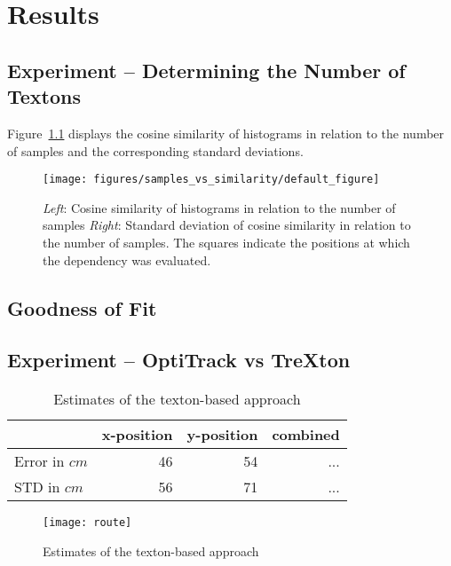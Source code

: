\chapter{Results}
\label{chap:results}

\section{Experiment -- Determining the Number of Textons}

Figure~\ref{fig:cosine} displays the cosine similarity of histograms
in relation to the number of samples and the corresponding standard
deviations.

\begin{figure}[h!]
\begin{center}
\texttt{[image: figures/samples\_vs\_similarity/default\_figure]}
\caption{{\label{fig:cosine} \emph{Left}:
    Cosine similarity of histograms in relation to the number of
    samples \emph{Right}: Standard deviation of cosine similarity in
    relation to the number of samples. The squares indicate the
    positions at which the dependency was evaluated.%
}}
\end{center}
\end{figure}

\section{Goodness of Fit}

\section{Experiment -- OptiTrack vs TreXton}
\label{sec:experiment-2}

\begin{table}[H]
  \centering
  \begin{tabular}{lrrr}
    \toprule
    & x-position & y-position & combined\\
    \midrule
    Error in $cm$ & 46 & 54 & ...\\
    STD in $cm$ & 56 & 71  & ...\\
    \bottomrule
  \end{tabular}
  \caption[Estimates of the texton-based approach]{Estimates of the texton-based approach}
  \label{tab:targetlanding}
\end{table}
\begin{figure}
\texttt{[image: route]}
  \caption[Estimates of the texton-based approach]{Estimates of the texton-based approach}
  \label{fig:route}
\end{figure}

